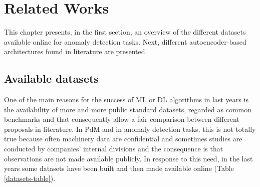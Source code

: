 \chapter{Related Works}

This chapter presents, in the first section, an overview of the different datasets available online for anomaly detection tasks. Next, different autoencoder-based architectures found in literature are presented.

\section{Available datasets}
One of the main reasons for the success of ML or DL algorithms in last years is the availability of more and more public standard datasets, regarded as common benchmarks and that consequently allow a fair comparison between different proposals in literature. In PdM and in anomaly detection tasks, this is not totally true because often machinery data are confidential and sometimes studies are conducted by companies' internal divisions and the consequence is that observations are not made available publicly. In response to this need, in the last years some datasets have been built and then made available online (Table \ref{datasets-table}).\\

